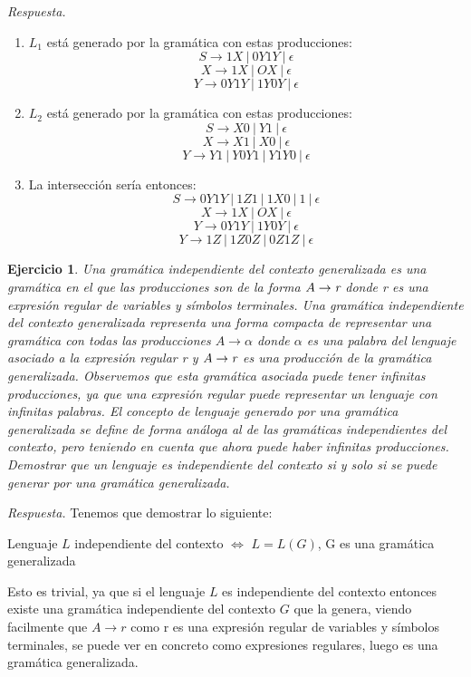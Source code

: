 \documentclass[11pt]{article}
\theoremstyle{ejercicio-style}
\newtheorem{ejer}{Ejercicio}
\begin{document}
\emph{Respuesta.}
\begin{enumerate}
	\item $L_1$ está generado por la gramática con estas producciones:
	$$ S \rightarrow 1X \ |\  0Y1Y \ | \ \epsilon $$
	$$ X \rightarrow 1X \ |\ OX \ | \ \epsilon $$
	$$ Y \rightarrow 0Y1Y \ | \ 1Y0Y \ | \ \epsilon $$
	\item $L_2$ está generado por la gramática con estas producciones:
	$$ S \rightarrow X0 \ |\  Y1 \ | \ \epsilon $$
	$$ X \rightarrow X1 \ |\ X0 \ | \ \epsilon $$
	$$ Y \rightarrow Y1 \ | \ Y0Y1 \ | \ Y1Y0 \ | \ \epsilon $$
	\item La intersección sería entonces:
	$$ S \rightarrow 0Y1Y \ |\  1Z1 \ | \ 1X0 \ | \ 1 \ | \ \epsilon $$
	$$ X \rightarrow 1X \ |\ OX \ | \ \epsilon $$
	$$ Y \rightarrow 0Y1Y \ | \ 1Y0Y \ | \ \epsilon $$
	$$ Y \rightarrow 1Z \ | \ 1Z0Z \ | \ 0Z1Z \ | \ \epsilon $$
\end{enumerate}
	
\begin{ejer}
Una gramática independiente del contexto generalizada es una gramática en el que las producciones son de la forma $A \rightarrow \emph{r}$ donde \emph{r} es una expresión regular de variables y símbolos terminales. Una gramática independiente del contexto generalizada representa una forma compacta de representar una gramática con todas las producciones $A \rightarrow \alpha$ donde $\alpha$ es una palabra del lenguaje asociado a la expresión regular \emph{r} y $A \rightarrow \emph{r}$ es una producción de la gramática generalizada. Observemos que esta gramática asociada puede tener infinitas producciones, ya que una expresión regular puede representar un lenguaje con infinitas palabras. El concepto de lenguaje generado por una gramática generalizada se define de forma análoga al de las gramáticas independientes del contexto, pero teniendo en cuenta que ahora puede haber infinitas producciones. Demostrar que un lenguaje es independiente del contexto si y solo si se puede generar por una gramática generalizada.
\end{ejer}

\emph{Respuesta.} Tenemos que demostrar lo siguiente:
	\begin{center}
		Lenguaje $L$ independiente del contexto $\iff$ $L=L(G)$, G es una gramática generalizada
	\end{center}
	\framebox{$\Rightarrow$} Esto es trivial, ya que si el lenguaje $L$ es independiente del contexto entonces existe una gramática independiente del contexto $G$ que la genera, viendo facilmente que $A \rightarrow r$ como r es una expresión regular de variables y símbolos terminales, se puede ver en concreto como expresiones regulares, luego es una gramática generalizada. \\
	
\end{document}
